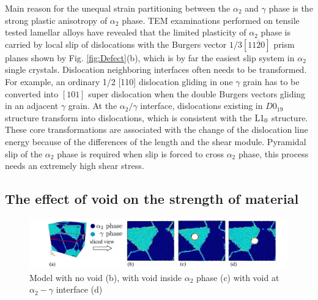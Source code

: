 \documentclass[Unknown,article,submit,moreauthors,pdftex,10pt,a4paper]{Definitions/mdpi}
\begin{document}
Main reason for the unequal strain partitioning between the $\alpha_2$ and $\gamma$ phase is the strong plastic anisotropy of  $\alpha_2$ phase. TEM examinations performed on tensile tested lamellar alloys have revealed that the limited plasticity of $\alpha_2$ phase is carried by local slip of dislocations with the Burgers vector $1/3[11\overline{2}0]$ prism planes shown by Fig. \ref{fig:Defect}(b), which is by far the easiest slip system in $\alpha_2$ single crystals.  Dislocation neighboring interfaces often needs to be transformed. For example, an ordinary 1/2 [110] dislocation gliding in one $\gamma$ grain has to be converted into $[101]$ super dislocation when the double Burgers vectors gliding in an adjacent $\gamma$ grain. At the $\alpha_2/\gamma$ interface, dislocations existing in $D0_{19}$ structure  transform into dislocations, which is consistent with the $\rm{L1_0}$ structure. These core transformations are associated with the change of the dislocation line energy because of the differences of the length and the shear module.  Pyramidal slip of the $\alpha_2$ phase is required when slip is forced to cross $\alpha_2$ phase, this process needs an extremely high shear stress.


\subsection{The effect of void on the strength of material}

\begin{figure}[ht]
	\centering
	\includegraphics[width=1\linewidth]{img/slice-view}
	\caption{ Model with no void (b), with void inside $\alpha_2$ phase (c) with void at $\alpha_2-\gamma$ interface (d)}
	\label{fig:model-creation}
\end{figure}
\end{document}
